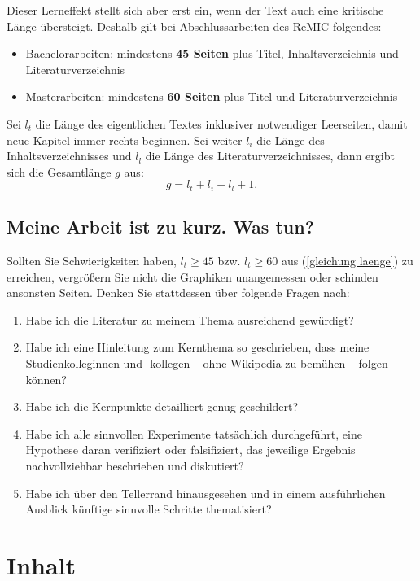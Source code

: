 Dieser Lerneffekt stellt sich aber erst ein, wenn der Text auch eine kritische Länge übersteigt.
Deshalb gilt bei Abschlussarbeiten des ReMIC folgendes:
\begin{itemize}
\item Bachelorarbeiten: mindestens \textbf{45 Seiten} plus Titel, Inhaltsverzeichnis und Literaturverzeichnis
\item Masterarbeiten: mindestens \textbf{60 Seiten} plus Titel und Literaturverzeichnis
\end{itemize}
Sei $l_t$ die Länge des eigentlichen Textes inklusiver notwendiger Leerseiten, damit neue Kapitel immer rechts beginnen.
Sei weiter $l_i$ die Länge des Inhaltsverzeichnisses und  $l_l$ die Länge des Literaturverzeichnisses, dann ergibt sich die Gesamtlänge $g$ aus:
\begin{equation}
g = l_t + l_i + l_l + 1.
\label{gleichung laenge}
\end{equation}

\subsection{Meine Arbeit ist zu kurz. Was tun?}\label{zuKurz}

Sollten Sie Schwierigkeiten haben, $l_t \ge 45$ bzw. $l_t \ge 60$ aus (\ref{gleichung laenge}) zu erreichen, vergrößern Sie nicht die Graphiken unangemessen oder schinden ansonsten Seiten.
Denken Sie stattdessen über folgende Fragen nach:
\begin{enumerate}
\item Habe ich die Literatur zu meinem Thema ausreichend gewürdigt?
\item Habe ich eine Hinleitung zum Kernthema so geschrieben, dass meine Studienkolleginnen und -kollegen -- ohne Wikipedia zu bemühen -- folgen können?
\item Habe ich die Kernpunkte detailliert genug geschildert?
\item Habe ich alle sinnvollen Experimente tatsächlich durchgeführt, eine Hypothese daran verifiziert oder falsifiziert, das jeweilige Ergebnis nachvollziehbar beschrieben und diskutiert?
\item Habe ich über den Tellerrand hinausgesehen und in einem ausführlichen Ausblick künftige sinnvolle Schritte thematisiert?
\end{enumerate}

\section{Inhalt}
\label{inhalt}


